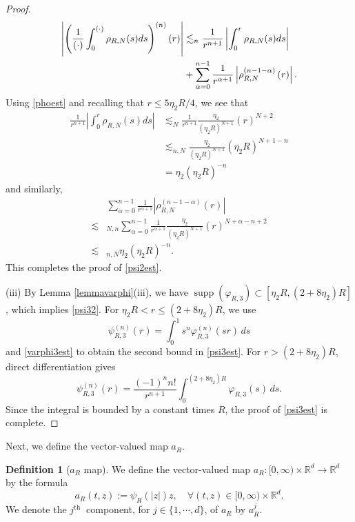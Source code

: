 \documentclass[reqno,11pt]{amsart}
\theoremstyle{plain}
\theoremstyle{definition}
\newtheorem{definition}[theorem]{Definition}
\numberwithin{equation}{section}
\numberwithin{theorem}{section}
\def\leq{\leqslant}
\begin{document}
\begin{proof}
\begin{align}
    \left|\left(\frac{1}{(\cdot)} \int_{0}^{(\cdot)} \rho_{R, N}(s) d s\right)^{(n)}(r)\right| &\lesssim_n \frac{1}{r^{n+1}}\left|\int_{0}^{r} \rho_{R, N}(s) d s\right|\notag\\
    &+\sum_{\alpha=0}^{n-1} \frac{1}{r^{\alpha+1}}\left|\rho_{R, N}^{(n-1-\alpha)}\left(r\right)\right|. 
\end{align}
Using \eqref{phoest} and recalling that $r \leq 5\eta_{2}R/4$, we see that
\begin{align*}
\frac{1}{r^{n+1}}\left|\int_{0}^{r} \rho_{R, N}(s) d s\right| & \lesssim_{N} \frac{1}{r^{n+1}} \frac{\eta_{2}}{\left(\eta_{2} R\right)^{N+1}}\left(r\right)^{N+2} \\
& \lesssim_{n, N} \frac{\eta_{2}}{\left(\eta_{2} R\right)^{N+1}}\left(\eta_{2} R\right)^{N+1-n} \\
& =\eta_2\left(\eta_{2} R\right)^{-n} 
\end{align*}
and similarly,
\begin{align*}
& \sum_{\alpha=0}^{n-1} \frac{1}{r^{\alpha+1}}\left|\rho_{R, N}^{(n-1-\alpha)}\left(r\right)\right| \\
 \lesssim&_{N, n} \sum_{\alpha=0}^{n-1} \frac{1}{r^{\alpha+1}}\frac{\eta_{2}}{\left(\eta_{2} R\right)^{N+1}}\left(r\right)^{N+\alpha-n+2} \\
 \lesssim&_{n, N} \eta_2\left(\eta_{2}R\right)^{-n} . 
\end{align*}
This completes the proof of \eqref{psi2est}.

 
 (iii) By Lemma \ref{lemmavarphi}(iii), we have
$\operatorname{supp}(\varphi_{R,3})\subset[\eta_2R,(2+8\eta_2)R]$,
which implies \eqref{psi32}. For $\eta_2R<r\leq(2+8\eta_2)R$, we use
\[
 \psi_{R,3}^{(n)}(r)=\int_0^1s^n\varphi_{R,3}^{(n)}(sr)\,ds
\]
and \eqref{varphi3est} to obtain the second bound in \eqref{psi3est}.
For $r>(2+8\eta_2)R$, direct differentiation gives
\[
 \psi_{R,3}^{(n)}(r)=\frac{(-1)^nn!}{r^{n+1}}
 \int_0^{(2+8\eta_2)R}\varphi_{R,3}(s)\,ds.
\]
Since the integral is bounded by a constant times $R$, the proof of \eqref{psi3est} is complete.
\end{proof}




Next, we define the vector-valued map $a_{R}$.
\begin{definition}[$a_{R}$ map]\label{defa}
   We define the  vector-valued map $a_{R}:[0, \infty) \times \mathbb{R}^{d} \rightarrow \mathbb{R}^{d}$ by the formula
\begin{equation*}
a_{R}(t, z):=\psi_{R}(|z|)  z, \quad \forall(t, z) \in[0, \infty) \times \mathbb{R}^{d} .
\end{equation*}
We denote the $j^{\text {th }}$ component, for $j \in\{1,\cdots,d\}$, of $a_{R}$ by $a_{R}^{j}$. 
\end{definition}
\end{document}
